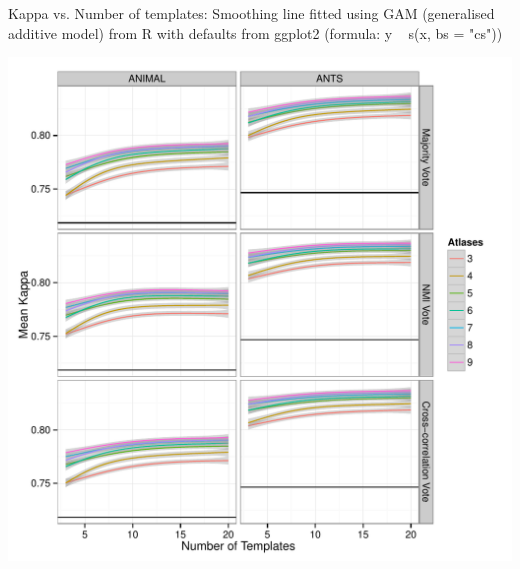 \documentclass{article}\usepackage{graphicx, color}
\makeatletter
\def\maxwidth{ %
  \ifdim\Gin@nat@width>\linewidth
    \linewidth
  \else
    \Gin@nat@width
  \fi
}
\newenvironment{knitrout}{}{} %
\makeatother
\begin{document}
Kappa vs. Number of templates: 
Smoothing line fitted using GAM (generalised additive model) from R with defaults from ggplot2 (formula: y ~ s(x, bs = "cs"))
\begin{knitrout}
\color{fgcolor}

{\centering \includegraphics[width=\maxwidth]{figure/a2a_facet} 

}


\end{knitrout}
\end{document}
